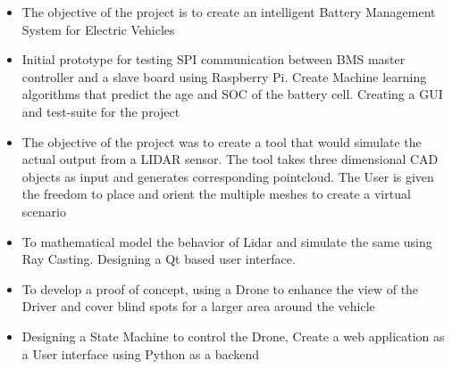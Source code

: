 \documentclass[10pt,a4paper,ragged2e,withhyper]{altacv}
\begin{document}
            \begin{itemize}
                \item The objective of the project is to create an intelligent Battery Management System for Electric Vehicles
                \item Initial prototype for testing SPI communication between BMS master controller and a slave board using Raspberry Pi. Create Machine learning algorithms that predict the age and SOC of the battery cell. Creating a GUI and test-suite for the project
            \end{itemize}
            \divider

            \begin{itemize}

                \item  The objective of the project was to create a tool that would simulate the actual output from a LIDAR sensor. The tool takes three dimensional CAD objects as input and generates corresponding pointcloud. The User is given the freedom to place and orient the multiple meshes to create a virtual scenario

                \item  To mathematical model the behavior of Lidar and simulate the same using Ray Casting. Designing a Qt based user interface.
            \end{itemize}

            \divider


            \begin{itemize}
                \item  To develop a proof of concept, using a Drone to enhance the view of the Driver and cover blind spots for a larger area around the vehicle

                \item  Designing a State Machine to control the Drone, Create a web application as a User interface using Python as a backend
            \end{itemize}


        
\end{document}
